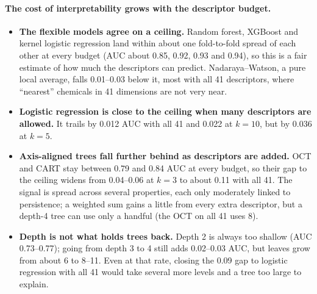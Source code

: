 \documentclass[11pt]{article}
\begin{document}
\paragraph{The cost of interpretability grows with the descriptor budget.}
\begin{itemize}
  \item \textbf{The flexible models agree on a ceiling.} Random forest, XGBoost and kernel logistic
        regression land within about one fold-to-fold spread of each other at every budget (AUC
        about 0.85, 0.92, 0.93 and 0.94), so this is a fair estimate of how much the descriptors
        can predict. Nadaraya--Watson, a pure local average, falls 0.01--0.03 below it, most with all
        41 descriptors, where ``nearest'' chemicals in 41 dimensions are not very near.
  \item \textbf{Logistic regression is close to the ceiling when many descriptors are allowed.} It
        trails by 0.012 AUC with all 41 and 0.022 at $k=10$, but by 0.036 at $k=5$.
  \item \textbf{Axis-aligned trees fall further behind as descriptors are added.} OCT and CART stay
        between 0.79 and 0.84 AUC at every budget, so their gap to the ceiling widens from
        0.04--0.06 at $k=3$ to about 0.11 with all 41. The signal is spread across several
        properties, each only moderately linked to persistence; a weighted sum gains a little from
        every extra descriptor, but a depth-4 tree can use only a handful (the OCT on all 41 uses 8).
  \item \textbf{Depth is not what holds trees back.} Depth 2 is always too shallow (AUC 0.73--0.77);
        going from depth 3 to 4 still adds 0.02--0.03 AUC, but leaves grow from about 6 to 8--11.
        Even at that rate, closing the 0.09 gap to logistic regression with all 41 would take
        several more levels and a tree too large to explain.
\end{itemize}
\end{document}
